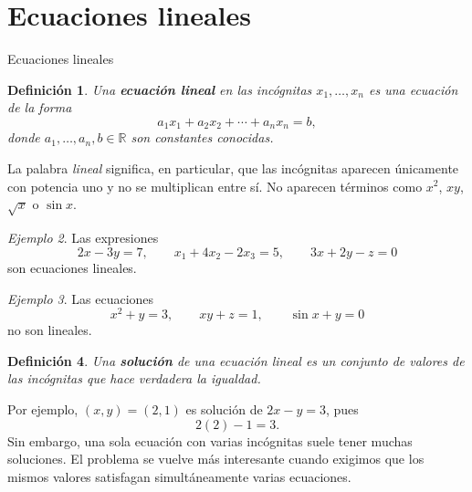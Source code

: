 \documentclass[aspectratio=169,9pt]{beamer}
\newtheorem{definicion}{Definición}[section]
\theoremstyle{remark}
\newtheorem{ejemplo}[definicion]{Ejemplo}
\newcommand{\R}{\mathbb{R}}
\begin{document}
\section{Ecuaciones lineales}
\begin{frame}[allowframebreaks,t]{Ecuaciones lineales}
\begin{definicion}
Una \textbf{ecuación lineal} en las incógnitas $x_1,\ldots,x_n$ es una ecuación de la forma
\[
a_1x_1+a_2x_2+\cdots+a_nx_n=b,
\]
donde $a_1,\ldots,a_n,b\in\R$ son constantes conocidas.
\end{definicion}

La palabra \emph{lineal} significa, en particular, que las incógnitas aparecen únicamente con potencia
uno y no se multiplican entre sí. No aparecen términos como $x^2$, $xy$, $\sqrt{x}$ o $\sin x$.

\begin{ejemplo}
Las expresiones
\[
2x-3y=7,\qquad x_1+4x_2-2x_3=5,\qquad 3x+2y-z=0
\]
son ecuaciones lineales.
\end{ejemplo}

\begin{ejemplo}
Las ecuaciones
\[
x^2+y=3,\qquad xy+z=1,\qquad \sin x+y=0
\]
no son lineales.
\end{ejemplo}

\begin{definicion}
Una \textbf{solución} de una ecuación lineal es un conjunto de valores de las incógnitas que hace verdadera
la igualdad.
\end{definicion}

Por ejemplo, $(x,y)=(2,1)$ es solución de $2x-y=3$, pues
\[
2(2)-1=3.
\]
Sin embargo, una sola ecuación con varias incógnitas suele tener muchas soluciones. El problema se vuelve
más interesante cuando exigimos que los mismos valores satisfagan simultáneamente varias ecuaciones.
\end{frame}
\end{document}
